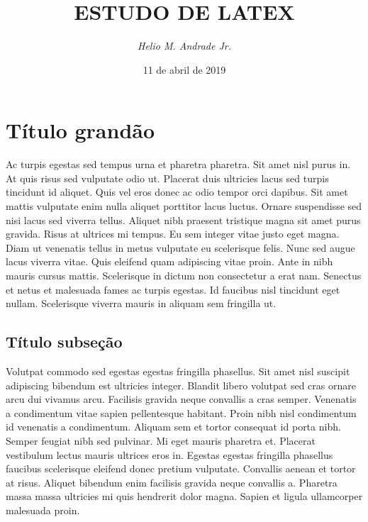 \documentclass[12pt]{article}
\begin{document}
	\title{ \textbf{ESTUDO DE LATEX} } %
	\author{ \textit{Helio M. Andrade Jr.} } %
	\date{11 de abril de 2019} %
	\maketitle %
	\thispagestyle{empty} %
	\newpage
	
	
	
	\setcounter{page}{1} %
	
	\tableofcontents %
	\newpage
	
	\listoffigures %
	\newpage
	
	\listoftables %
	\newpage
	
	\setcounter{page}{1}  %
	\section{Título grand\~ao}
		Ac turpis egestas sed tempus urna et pharetra pharetra. Sit amet nisl purus in. At quis risus sed vulputate odio ut. Placerat duis ultricies lacus sed turpis tincidunt id aliquet. Quis vel eros donec ac odio tempor orci dapibus. Sit amet mattis vulputate enim nulla aliquet porttitor lacus luctus. Ornare suspendisse sed nisi lacus sed viverra tellus. Aliquet nibh praesent tristique magna sit amet purus gravida. Risus at ultrices mi tempus. Eu sem integer vitae justo eget magna. Diam ut venenatis tellus in metus vulputate eu scelerisque felis. Nunc sed augue lacus viverra vitae. Quis eleifend quam adipiscing vitae proin. Ante in nibh mauris cursus mattis. Scelerisque in dictum non consectetur a erat nam. Senectus et netus et malesuada fames ac turpis egestas. Id faucibus nisl tincidunt eget nullam. Scelerisque viverra mauris in aliquam sem fringilla ut.
	\subsection{Título subseção}
		Volutpat commodo sed egestas egestas fringilla phasellus. Sit amet nisl suscipit adipiscing bibendum est ultricies integer. Blandit libero volutpat sed cras ornare arcu dui vivamus arcu. Facilisis gravida neque convallis a cras semper. Venenatis a condimentum vitae sapien pellentesque habitant. Proin nibh nisl condimentum id venenatis a condimentum. Aliquam sem et tortor consequat id porta nibh. Semper feugiat nibh sed pulvinar. Mi eget mauris pharetra et. Placerat vestibulum lectus mauris ultrices eros in. Egestas egestas fringilla phasellus faucibus scelerisque eleifend donec pretium vulputate. Convallis aenean et tortor at risus. Aliquet bibendum enim facilisis gravida neque convallis a. Pharetra massa massa ultricies mi quis hendrerit dolor magna. Sapien et ligula ullamcorper malesuada proin.
\end{document}
